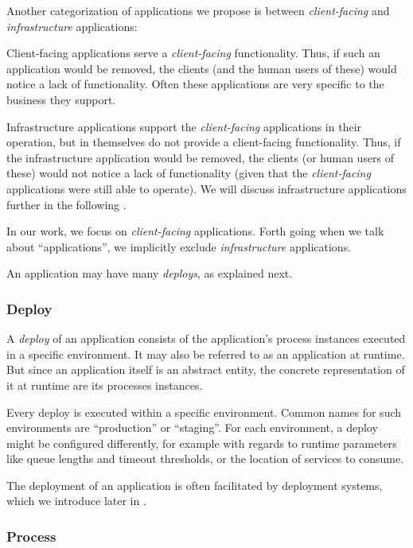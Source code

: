 Another categorization of applications we propose is between \emph{client-facing} and \emph{infrastructure} applications:
\begin{tdescription}
  \item[Client-facing applications] serve a \emph{client-facing} functionality. Thus, if such an application would be removed, the clients (and the human users of these) would notice a lack of functionality. Often these applications are very specific to the business they support.
  \item[Infrastructure applications] support the \emph{client-facing} applications in their operation, but in themselves do not provide a client-facing functionality. Thus, if the infrastructure application would be removed, the clients (or human users of these) would not notice a lack of functionality (given that the \emph{client-facing} applications were still able to operate). We will discuss infrastructure applications further in the following .
\end{tdescription}

In our work, we focus on \emph{client-facing} applications. Forth going when we talk about ``applications'', we implicitly exclude \emph{infrastructure} applications.

An application may have many \emph{deploys}, as explained next.

\subsubsection{Deploy}

A \emph{deploy} of an application consists of the application's process instances executed in a specific environment. It may also be referred to as an application at runtime. But since an application itself is an abstract entity, the concrete representation of it at runtime are its processes instances.

Every deploy is executed within a specific environment. Common names for such environments are ``production'' or ``staging''. For each environment, a deploy might be configured differently, for example with regards to runtime parameters like queue lengths and timeout thresholds, or the location of services to consume.

The deployment of an application is often facilitated by deployment systems, which we introduce later in .

\subsubsection{Process}

